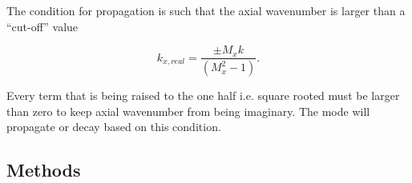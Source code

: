 \documentclass[a4paper]{report}
\begin{document}
The condition for propagation is such that the axial wavenumber is larger than 
a ``cut-off'' value

\begin{equation}
    k_{x,real}  = \frac{\pm M_x k }{\left( M_x^2 - 1 \right)}.
    \label{eqn:cuton}
\end{equation}

Every term that is being raised to the one half i.e. square rooted must 
be larger than zero to keep axial wavenumber from being imaginary. The mode 
will propagate or decay based on this condition. 

\subsection{Methods}






\end{document}
